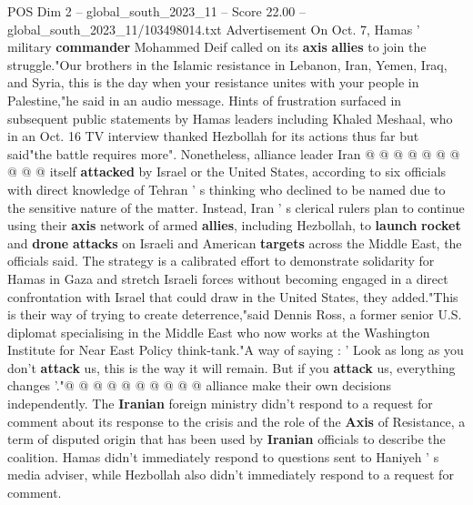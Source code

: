 \begin{textsample}{POS Dim 2 – global\_south\_2023\_11 – Score 22.00 – global\_south\_2023\_11/103498014.txt}
Advertisement On Oct. 7, Hamas ' military \textbf{commander} Mohammed Deif called on its \textbf{axis} \textbf{allies} to join the struggle."Our brothers in the Islamic resistance in Lebanon, Iran, Yemen, Iraq, and Syria, this is the day when your resistance unites with your people in Palestine,"he said in an audio message.
Hints of frustration surfaced in subsequent public statements by Hamas leaders including Khaled Meshaal, who in an Oct. 16 TV interview thanked Hezbollah for its actions thus far but said"the battle requires more".
Nonetheless, alliance leader Iran @ @ @ @ @ @ @ @ @ @ itself \textbf{attacked} by Israel or the United States, according to six officials with direct knowledge of Tehran ' s thinking who declined to be named due to the sensitive nature of the matter.
Instead, Iran ' s clerical rulers plan to continue using their \textbf{axis} network of armed \textbf{allies}, including Hezbollah, to \textbf{launch} \textbf{rocket} and \textbf{drone} \textbf{attacks} on Israeli and American \textbf{targets} across the Middle East, the officials said.
The strategy is a calibrated effort to demonstrate solidarity for Hamas in Gaza and stretch Israeli forces without becoming engaged in a direct confrontation with Israel that could draw in the United States, they added."This is their way of trying to create deterrence,"said Dennis Ross, a former senior U.S. diplomat specialising in the Middle East who now works at the Washington Institute for Near East Policy think-tank."A way of saying : ' Look as long as you don't \textbf{attack} us, this is the way it will remain.
But if you \textbf{attack} us, everything changes '."@ @ @ @ @ @ @ @ @ @ alliance make their own decisions independently.
The \textbf{Iranian} foreign ministry didn't respond to a request for comment about its response to the crisis and the role of the \textbf{Axis} of Resistance, a term of disputed origin that has been used by \textbf{Iranian} officials to describe the coalition.
Hamas didn't immediately respond to questions sent to Haniyeh ' s media adviser, while Hezbollah also didn't immediately respond to a request for comment.

\end{textsample}
